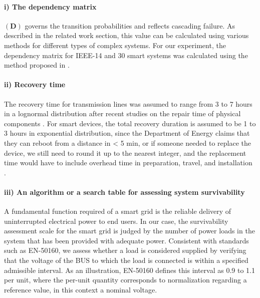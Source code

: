 \documentclass[conference]{IEEEtran}
\begin{document}
\paragraph{i) The dependency matrix} $(\mathbf{D})$ governs the transition probabilities and reflects cascading failure. As described in the related work section, this value can be calculated using various methods for different types of complex systems. For our experiment, the dependency matrix for IEEE-14 and 30 smart systems was calculated using the method proposed in \cite{redacted}. %

\paragraph{ii) Recovery time}
The recovery time for transmission lines was assumed to range from 3 to 7 hours in a lognormal distribution after recent studies on the repair time of physical components \cite{zapata_repair_2008, arif_optimizing_2018}. For smart devices, the total recovery duration is assumed to be 1 to 3 hours in exponential distribution, since the Department of Energy claims that they can reboot from a distance in < 5 min, or if someone needed to replace the device, we still need to round it up to the nearest integer, and the replacement time would have to include overhead time in preparation, travel, and installation \cite{noauthor_recovery_nodate, arif_optimizing_2018}.

\paragraph{iii)  An algorithm or a search table for assessing system survivability} A fundamental function required of a smart grid is the reliable delivery of uninterrupted electrical power to end users. In our case, the survivability assessment scale for the smart grid is judged by the number of power loads in the system that has been provided with adequate power. Consistent with standards such as EN-50160, we assess whether a load is considered supplied by verifying that the voltage of the BUS to which the load is connected is within a specified admissible interval. As an illustration, EN-50160 defines this interval as 0.9 to 1.1 per unit, where the per-unit quantity corresponds to normalization regarding a reference value, in this context a nominal voltage.
\end{document}
